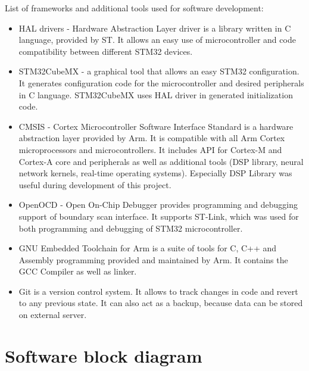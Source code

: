 \documentclass[a4paper,twoside,12pt]{book}
\begin{document}
\newpage

List of frameworks and additional tools used for software development:

\begin{itemize}
    \item HAL drivers
    - Hardware Abstraction Layer driver is a library written in C language, provided by ST.
    It allows an easy use of microcontroller and code compatibility between different STM32 devices.
    \cite{ST:HAL}
    \item STM32CubeMX
    - a graphical tool that allows an easy STM32 configuration.
    It generates configuration code for the microcontroller and desired peripherals in C language.
    STM32CubeMX uses HAL driver in generated initialization code.
    \item CMSIS
    - Cortex Microcontroller Software Interface Standard
    is a hardware abstraction layer provided by Arm.
    It is compatible with all Arm Cortex microprocessors and microcontrollers.
    It includes API for Cortex-M and Cortex-A core and peripherals as well as additional tools
    (DSP library, neural network kernels, real-time operating systems).
    Especially DSP Library was useful during development of this project.
    \cite{CMSIS_DSP}
    \item OpenOCD
    - Open On-Chip Debugger provides programming and debugging support of boundary scan interface.
    It supports ST-Link, which was used for both programming and debugging of STM32 microcontroller.
    \item GNU Embedded Toolchain for Arm
    is a suite of tools for C, C++ and Assembly programming provided and maintained by Arm.
    It contains the GCC Compiler as well as linker.
    \item Git
    is a version control system. It allows to track changes in code
    and revert to any previous state.
    It can also act as a backup, because data can be stored on external server.
\end{itemize}

\section{Software block diagram}
\end{document}
